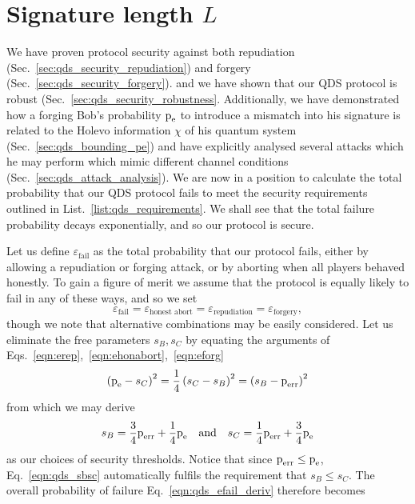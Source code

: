 \clearpage
\section{Signature length $L$}\label{sec:qds_siglength}
We have proven protocol security against both repudiation (Sec.~\ref{sec:qds_security_repudiation}) and forgery (Sec.~\ref{sec:qds_security_forgery}). and we have shown that our QDS protocol is robust (Sec.~\ref{sec:qds_security_robustness}. Additionally, we have demonstrated how a forging Bob's probability $\text{p}_{\text{e}}$ to introduce a mismatch into his signature is related to the Holevo information $\chi$ of his quantum system (Sec.~\ref{sec:qds_bounding_pe}) and have explicitly analysed several attacks which he may perform which mimic different channel conditions (Sec.~\ref{sec:qds_attack_analysis}). We are now in a position to calculate the total probability that our QDS protocol fails to meet the security requirements outlined in List.~\ref{list:qds_requirements}. We shall see that the total failure probability decays exponentially, and so our protocol is secure.

Let us define $\varepsilon_{\text{fail}}$ as the total probability that our protocol fails, either by allowing a repudiation or forging attack, or by aborting when all players behaved honestly. To gain a figure of merit we assume that the protocol is equally likely to fail in any of these ways, and so we set
\begin{equation}\label{eqn:qds_efail_deriv}
\varepsilon_{\text{fail}} = \varepsilon_{\text{honest abort}} = \varepsilon_{\text{repudiation}} = \varepsilon_{\text{forgery}},
\end{equation}
though we note that alternative combinations may be easily considered. Let us eliminate the free parameters $s_B, s_C$ by equating the arguments of Eqs.~\ref{eqn:erep},~\ref{eqn:ehonabort},~\ref{eqn:eforg}
\begin{equation}
\left(\text{p}_{\text{e}} - s_C\right)^2  = \frac{1}{4}\left(s_C - s_B\right)^2 = \left(s_B - \text{p}_{\text{err}}\right)^2
\end{equation}
from which we may derive
\begin{equation}\label{eqn:qds_sbsc}
s_B = \frac{3}{4} \perr + \frac{1}{4}\pe \qq{and} s_C = \frac{1}{4}\perr + \frac{3}{4}\pe
\end{equation}
as our choices of security thresholds. Notice that since $\text{p}_{\text{err}} \le \text{p}_{\text{e}}$, Eq.~\ref{eqn:qds_sbsc} automatically fulfils the requirement that $s_B \le s_C$. The overall probability of failure Eq.~\ref{eqn:qds_efail_deriv} therefore becomes

